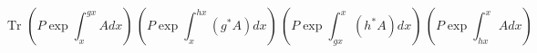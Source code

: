 \begin{equation} \label{simpdougloop}
\mbox{Tr }
\left( P \exp \int_x^{gx} A dx \right) \,
\left( P \exp \int_{x}^{hx} (g^* A) dx \right) \,
\left( P \exp \int_{gx}^{x} (h^* A) dx \right) \,
\left( P \exp \int_{hx}^x A dx \right)
\end{equation}

